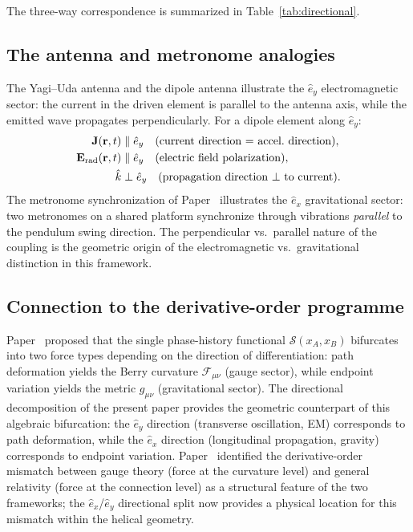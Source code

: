 \documentclass[%
 reprint, amsmath,amssymb, aps, prb, ]{revtex4-2}
\numberwithin{equation}{section}
\newcommand{\ehat}[1]{\hat{e}_{#1}}
\begin{document}
The three-way correspondence is summarized in Table~\ref{tab:directional}.

\subsection{The antenna and metronome analogies}

The Yagi--Uda antenna and the dipole antenna illustrate the $\ehat{y}$ electromagnetic sector: the current in the driven element is parallel to the antenna axis, while the emitted wave propagates perpendicularly. For a dipole element along $\ehat{y}$:
\begin{align}
\mathbf{J}(\mathbf{r}, t) &\parallel \ehat{y} \quad \text{(current direction = accel.\ direction)},\notag\\
\mathbf{E}_\mathrm{rad}(\mathbf{r}, t) &\parallel \ehat{y} \quad \text{(electric field polarization)},\notag\\
\hat{k} &\perp \ehat{y} \quad \text{(propagation direction $\perp$ to current)}.
\end{align}
The metronome synchronization of Paper~\cite{hanamura34} illustrates the $\ehat{x}$ gravitational sector: two metronomes on a shared platform synchronize through vibrations \emph{parallel} to the pendulum swing direction. The perpendicular vs.\ parallel nature of the coupling is the geometric origin of the electromagnetic vs.\ gravitational distinction in this framework.

\subsection{Connection to the derivative-order programme}

Paper~\cite{hanamura51} proposed that the single phase-history functional $\mathcal{S}(x_A, x_B)$ bifurcates into two force types depending on the direction of differentiation: path deformation yields the Berry curvature $\mathcal{F}_{\mu\nu}$ (gauge sector), while endpoint variation yields the metric $g_{\mu\nu}$ (gravitational sector). The directional decomposition of the present paper provides the geometric counterpart of this algebraic bifurcation: the $\ehat{y}$ direction (transverse oscillation, EM) corresponds to path deformation, while the $\ehat{x}$ direction (longitudinal propagation, gravity) corresponds to endpoint variation.
Paper~\cite{hanamura40} identified the derivative-order mismatch between gauge theory (force at the curvature level) and general relativity (force at the connection level) as a structural feature of the two frameworks; the $\ehat{x}$/$\ehat{y}$ directional split now provides a physical location for this mismatch within the helical geometry.
\end{document}
